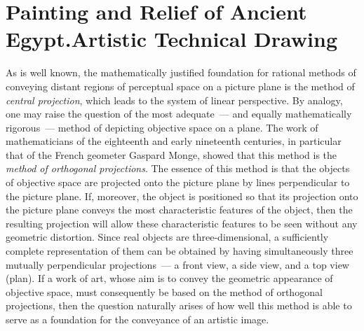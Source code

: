\chapter{Painting and Relief of Ancient Egypt.\newline Artistic Technical Drawing}


As is well known, the mathematically justified foundation for rational methods of
conveying distant regions of perceptual space on a picture plane is the method of
\textit{central projection}, which leads to the system of linear perspective. By analogy,
one may raise the question of the most adequate~--- and equally mathematically
rigorous~--- method of depicting objective space on a plane. The work of mathematicians
of the eighteenth and early nineteenth centuries, in particular that of the French
geometer Gaspard Monge, showed that this method is the \textit{method of orthogonal
projections}. The essence of this method is that the objects of objective space are
projected onto the picture plane by lines perpendicular to the picture plane. If,
moreover, the object is positioned so that its projection onto the picture plane conveys
the most characteristic features of the object, then the resulting projection will allow
these characteristic features to be seen without any geometric distortion. Since real
objects are three-dimensional, a sufficiently complete representation of them can be
obtained by having simultaneously three mutually perpendicular projections~--- a front
view, a side view, and a top view (plan). If a work of art, whose aim is to convey the
geometric appearance of objective space, must consequently be based on the method of
orthogonal projections, then the question naturally arises of how well this method is
able to serve as a foundation for the conveyance of an artistic image.

